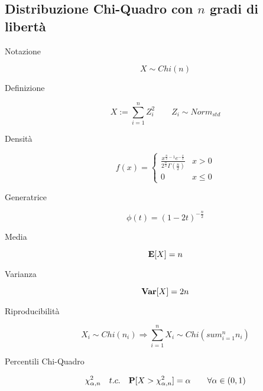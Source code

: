 \subsection{Distribuzione Chi-Quadro con $n$ gradi di libertà}

\begin{description}
	
	\item [Notazione]
		\begin{equation}
		X \sim Chi(n)
		\end{equation}
	
	\item [Definizione]
		\begin{equation}
		X := \sum_{i=1}^{n}Z_{i}^{2} \qquad Z_{i} \sim Norm_{std}
		\end{equation}
	
	\item [Densità]
		\begin{equation}
		f(x) = \left\{\begin{matrix}
		\frac{x^{\frac{n}{2}-1}e^{-\frac{x}{2}}}{2^{\frac{n}{2}}\Gamma(\frac{n}{2})} & x > 0\\
		0 & x \leq 0
		\end{matrix}\right.
		\end{equation}
	
	\item [Generatrice]
		\begin{equation}
		\phi(t) = (1-2t)^{-\frac{n}{2}}
		\end{equation}
	
	\item [Media]
		\begin{equation}
		\mathbf{E}[X] = n
		\end{equation}
	
	\item [Varianza]
		\begin{equation}
		\mathbf{Var}[X] = 2n
		\end{equation}
	
	\item [Riproducibilità]
		\begin{equation}
		X_{i} \sim Chi(n_{i}) \Rightarrow \sum_{i=1}^{n}X_{i} \sim Chi(sum_{i=1}^{n}n_{i})
		\end{equation}
	
	\item [Percentili Chi-Quadro]
		\begin{equation}
		\chi^{2}_{\alpha,n}\quad t.c. \quad \mathbf{P}[X > \chi^{2}_{\alpha,n}] = \alpha \qquad\forall \alpha \in (0,1)
		\end{equation}
	
\end{description}


